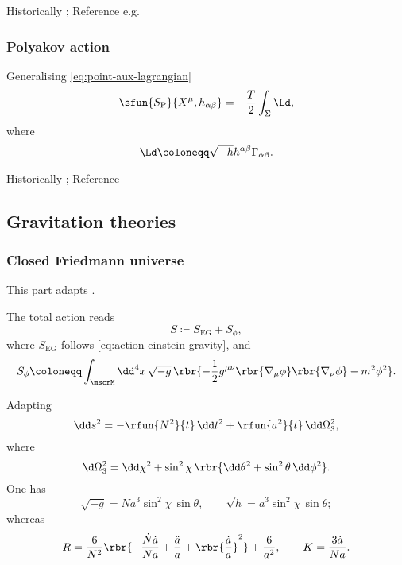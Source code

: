 \documentclass[a4paper,11pt]{article}
\begin{document}
Historically \cite{Nambu1970,Goto1971}; Reference e.g.\ 
\cite{Blumenhagen2013}
\cite[sec.\ 3.2]{Kiefer2012}

\subsubsection*{Polyakov action}

Generalising \eqref{eq:point-aux-lagrangian}
\begin{equation}
\sfun{S_\text{P}}{X^\mu, h_{\alpha\beta}} = -\frac{T}{2}\int_\Sigma \Ld,
\end{equation}
where
\begin{equation}
\Ld \coloneqq \sqrt{-h} h^{\alpha\beta}\Gamma_{\alpha\beta}.
\end{equation}



Historically \cite{Brink1976,Deser1976,Polyakov1981};
Reference
\cite[sec.\ 3.2]{Kiefer2012}







\subsection{Gravitation theories}

\subsubsection*{Closed Friedmann universe}
This part adapts \cite[sec.\ 8.1.2]{Kiefer2012}.

The total action reads
\begin{equation}
S \coloneqq S_\text{EG} + S_\phi,
\end{equation}
where $S_\text{EG}$ follows \eqref{eq:action-einstein-gravity}, and
\begin{equation}
S_\phi \coloneqq \int_\mscrM\dd^4 x\, \sqrt{-g}\,
\rbr{-\frac{1}{2} g^{\mu\nu} \rbr{\nabla_\mu\phi} \rbr{\nabla_\nu\phi}
-m^2\phi^2}.
\end{equation}

Adapting
\begin{equation}
\dd s^2 = -\rfun{N^2}{t}\,\dd t^2 + \rfun{a^2}{t}\,\dd\Omega_3^2,
\end{equation}
where
\begin{equation}
\d\Omega_3^2 = \dd\chi^2+\sin^2\chi\,\rbr{\dd\theta^2+\sin^2\theta\,\dd\phi^2}.
\end{equation}
One has
\begin{equation}
\sqrt{-g} = N a^3 \sin^2\chi\,\sin\theta,\qquad
\sqrt{h} = a^3\sin^2\chi\,\sin\theta;
\end{equation}
whereas
\begin{equation}
R = \frac{6}{N^2}\rbr{-\frac{\dot{N}\dot{a}}{Na} + \frac{\ddot{a}}{a} + 
\rbr{\frac{\dot{a}}{a}}^2} + \frac{6}{a^2},\qquad
K = \frac{3\dot{a}}{Na}.
\end{equation}
\end{document}

